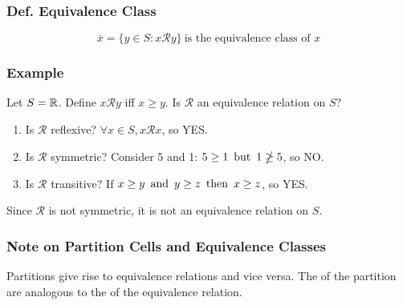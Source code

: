 \subsubsection{Def. Equivalence Class}
\[
    \overline{x} = \{y \in S : x\mathcal{R}y\} ~\text{is the equivalence class of $x$}
\]

\subsubsection*{Example}
Let $S = \mathbb{R}$. Define $x\mathcal{R}y$ iff $x \geq y$. Is $\mathcal{R}$ an equivalence relation on $S$?
\begin{enumerate}
    \item Is $\mathcal{R}$ reflexive? $\forall x \in S, x\mathcal{R}x$, so YES.
    \item Is $\mathcal{R}$ symmetric? Consider 5 and 1: $5 \geq 1 \operatorname{~\text{but}~} 1 \ngeq 5$, so NO.
    \item Is $\mathcal{R}$ transitive? If $x \geq y \operatorname{~\text{and}~} y \geq z \operatorname{~\text{then}~} x \geq z$, so YES.
\end{enumerate}
Since $\mathcal{R}$ is not symmetric, it is not an equivalence relation on $S$.

\subsubsection*{Note on Partition Cells and Equivalence Classes}
Partitions give rise to equivalence relations and vice versa. The  of the partition are analogous to the  of the equivalence relation.
